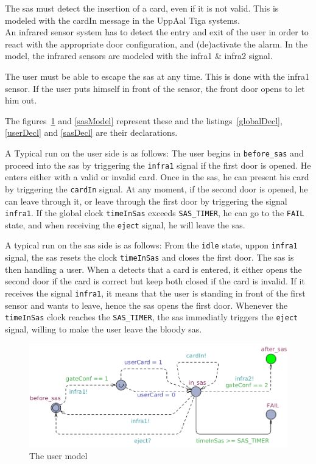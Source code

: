 The sas must detect the insertion of a card, even if it is not valid. This is modeled with the cardIn message in the UppAal Tiga systems.\\

An infrared sensor system has to detect the entry and exit of the user in order to react with the appropriate door configuration, and (de)activate the alarm. In the model, the infrared sensors are modeled with the infra1 \& infra2 signal.

The user must be able to escape the sas at any time. This is done with the infra1 sensor. If the user puts himself in front of the sensor, the front door opens to let him out.

The figures~\ref{userModel} and \ref{sasModel} represent these and the listings~\ref{globalDecl}, \ref{userDecl} and \ref{sasDecl} are their declarations.

A Typical run on the user side is as follows: The user begins in \texttt{before\_sas} and proceed into the sas by triggering the \texttt{infra1} signal if the first door is opened. He enters either with a valid or invalid card.
Once in the sas, he can present his card by triggering the \texttt{cardIn} signal.
At any moment, if the second door is opened, he can leave through it, or leave through the first door by triggering the signal \texttt{infra1}.
If the global clock \texttt{timeInSas} exceeds \texttt{SAS\_TIMER}, he can go to the \texttt{FAIL} state, and when receiving the \texttt{eject} signal, he will leave the sas.

A typical run on the sas side is as follows: From the \texttt{idle} state, uppon \texttt{infra1} signal, the sas resets the clock \texttt{timeInSas} and closes the first door. 
The sas is then handling a user. 
When a detects that a card is entered, it either opens the second door if the card is correct but keep both closed if the card is invalid.
If it receives the signal \texttt{infra1}, it means that the user is standing in front of the first sensor and wants to leave, hence the sas opens the first door.
Whenever the \texttt{timeInSas} clock reaches the \texttt{SAS\_TIMER}, the sas immediatly triggers the \texttt{eject} signal, willing to make the user leave the bloody sas.


\begin{figure}[!h]
	\centering
    \includegraphics[width=\textwidth]{User_model.png}
    \caption{The user model}
    \label{userModel}
\end{figure}

